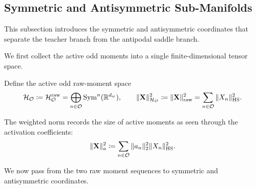 
\subsection{Symmetric and Antisymmetric Sub-Manifolds}
\label{subsec:introduce-symmetric-antisymmetric-branches-and-saddle-point}
This subsection introduces the symmetric and antisymmetric coordinates that separate the teacher branch from the antipodal saddle branch.

We first collect the active odd moments into a single finite-dimensional tensor space.

Define the active odd raw-moment space
\begin{equation}
    \mathcal H_{\mathcal O}
    \coloneq
    \mathcal H_{\mathcal O}^{\mathrm{raw}}
    =
    \bigoplus_{n\in\mathcal O}\mathrm{Sym}^n(\mathbb{R}^{d_w}),
    \qquad
    \|\mathbf X\|_{\mathcal H_{\mathcal O}}^2
    \coloneq
    \|\mathbf X\|_{\mathrm{raw}}^2
    =
    \sum_{n\in\mathcal O}\|X_n\|_{\mathrm{HS}}^2.
\end{equation}

The weighted norm records the size of active moments as seen through the
activation coefficients:
\begin{equation}
\label{eq:def-weighted-active-norm}
    \|\mathbf X\|_{a}^2
    \coloneq
    \sum_{n\in\mathcal O}\|a_n\|_2^2\|X_n\|_{\mathrm{HS}}^2.
\end{equation}

We now pass from the two raw moment sequences to symmetric and antisymmetric coordinates.

